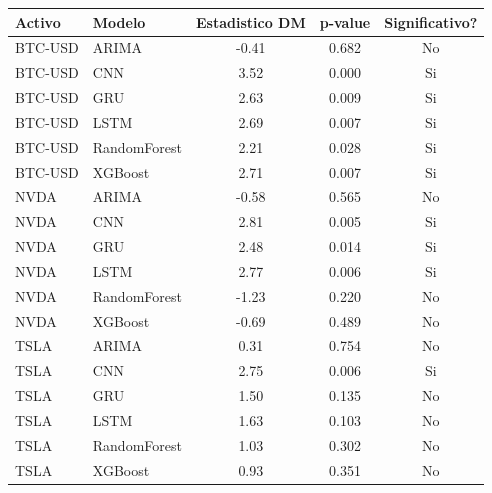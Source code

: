 \begin{tabular}{l|l|ccc}
\hline
\textbf{Activo} & \textbf{Modelo} & \textbf{Estadistico DM} & \textbf{p-value} & \textbf{Significativo?} \\
\hline
BTC-USD & ARIMA & -0.41 & 0.682 & No \\
BTC-USD & CNN & 3.52 & 0.000 & Si \\
BTC-USD & GRU & 2.63 & 0.009 & Si \\
BTC-USD & LSTM & 2.69 & 0.007 & Si \\
BTC-USD & RandomForest & 2.21 & 0.028 & Si \\
BTC-USD & XGBoost & 2.71 & 0.007 & Si \\
NVDA & ARIMA & -0.58 & 0.565 & No \\
NVDA & CNN & 2.81 & 0.005 & Si \\
NVDA & GRU & 2.48 & 0.014 & Si \\
NVDA & LSTM & 2.77 & 0.006 & Si \\
NVDA & RandomForest & -1.23 & 0.220 & No \\
NVDA & XGBoost & -0.69 & 0.489 & No \\
TSLA & ARIMA & 0.31 & 0.754 & No \\
TSLA & CNN & 2.75 & 0.006 & Si \\
TSLA & GRU & 1.50 & 0.135 & No \\
TSLA & LSTM & 1.63 & 0.103 & No \\
TSLA & RandomForest & 1.03 & 0.302 & No \\
TSLA & XGBoost & 0.93 & 0.351 & No \\
\hline
\end{tabular}